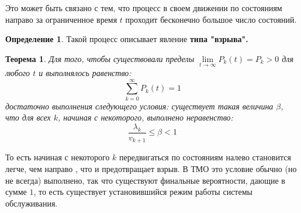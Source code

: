 \documentclass[aps,%
12pt,%
final,%
oneside,
onecolumn,%
musixtex, %
superscriptaddress,%
centertags]{article} %
\theoremstyle{plain}
\newtheorem{theorem}{Теорема}[section] %
\theoremstyle{definition}
\newtheorem{definition}{Определение}[subsection]
\theoremstyle{remark}
\begin{document}
Это может быть связано с тем, что процесс в своем движении по
состояниям направо за ограниченное время $t$ проходит бесконечно
большое число состояний. 

\begin{definition}
	Такой процесс описывает явление \textbf{типа "взрыва".}
\end{definition}

\begin{theorem}
	Для того, чтобы существовали пределы $\lim\limits_{t \to \infty} P_k(t) = P_k > 0$ для любого $t$ и выполнялось равенство:
	$$\sum\limits_{k=0}^{\infty} P_k(t) = 1$$
	достаточно выполнения следующего условия: существует такая величина $\beta$, что для всех $k$, начиная с некоторого, выполнено неравенство:
	$$\frac{\lambda_k}{v_{k+1}} \leq \beta <1$$
\end{theorem}

То есть начиная с некоторого $k$ передвигаться по состояниям налево становится легче, чем направо , что и предотвращает взрыв. В ТМО это условие обычно (но не всегда) выполнено, так что существуют финальные вероятности, дающие в сумме $1$, то есть существует установившийся режим работы системы обслуживания.
\end{document}

